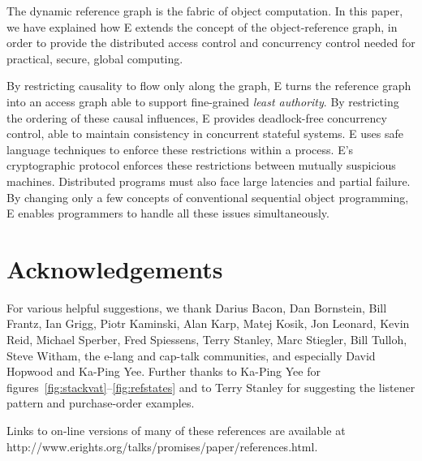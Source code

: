 \documentclass{llncs}
\begin{document}
The dynamic reference graph is the fabric of object computation. In
this paper, we have explained how E extends the concept of the
object-reference graph, in order to provide the distributed
access control and concurrency control needed for practical, secure,
global computing.

By restricting causality to flow only along the graph, E turns the
reference graph into an access graph able to support fine-grained
\emph{least authority}. By restricting the ordering of these causal
influences, E provides deadlock-free concurrency control, able to
maintain consistency in concurrent stateful systems.  E uses safe
language techniques to enforce these restrictions within a
process. E's cryptographic protocol enforces these restrictions
between mutually suspicious machines. Distributed programs must also
face large latencies and partial failure. By changing only a few
concepts of conventional sequential object programming, E enables
programmers to handle all these issues simultaneously.

\section{Acknowledgements}
For various helpful suggestions, we thank
Darius Bacon,
Dan Bornstein,
Bill Frantz,
Ian Grigg,
Piotr Kaminski,
Alan Karp,
Matej Kosik,
Jon Leonard,
Kevin Reid,
Michael Sperber,
Fred Spiessens,
Terry Stanley,
Marc Stiegler,
Bill Tulloh,
Steve Witham,
the e-lang and cap-talk communities,
and especially
David Hopwood and
Ka-Ping Yee.
Further thanks to Ka-Ping Yee for
figures~\ref{fig:stackvat}--\ref{fig:refstates}
and to Terry Stanley for suggesting the listener pattern
and purchase-order examples.


%
Links to on-line versions of many of these references are available at
http://www.erights.org/talks/promises/paper/references.html.

%

\end{document}
